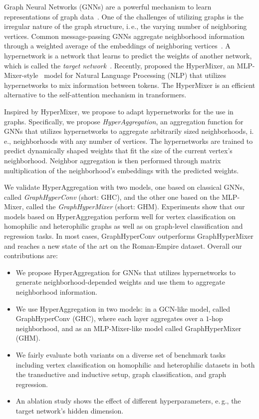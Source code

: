\documentclass[conference]{IEEEtran}
\newcommand{\ie}{i.\,e.,\xspace}
\newcommand{\eg}{e.\,g.,\xspace}
\begin{document}
Graph Neural Networks (GNNs) are a powerful mechanism to learn representations of graph data~\citep{DBLP:series/synthesis/2020Hamilton}.
One of the challenges of utilizing graphs is the irregular nature of the graph structure, \ie the varying number of neighboring vertices.
Common message-passing GNNs aggregate neighborhood information through a weighted average of the embeddings of neighboring vertices~\citep{DBLP:conf/iclr/KipfW17,DBLP:conf/iclr/VelickovicCCRLB18}.
A hypernetwork is a network that learns to predict the weights of another network, which is called the \textit{target network}~\citep{DBLP:conf/iclr/HaDL17}.
Recently, \citet{DBLP:conf/acl/MaiPFCMF023} proposed the HyperMixer, an MLP-Mixer-style~\citep{DBLP:conf/nips/TolstikhinHKBZU21} model for Natural Language Processing (NLP) that utilizes hypernetworks to mix information between tokens.
The HyperMixer is an efficient alternative to the self-attention mechanism in transformers.

Inspired by HyperMixer, we propose to adapt hypernetworks for the use in graphs.
Specifically, we propose \textit{HyperAggregation}, an aggregation function for GNNs that utilizes hypernetworks to aggregate arbitrarily sized neighborhoods, \ie neighborhoods with any number of vertices.
The hypernetworks are trained to predict dynamically shaped weights that fit the size of the current vertex's neighborhood.
Neighbor aggregation is then performed through matrix multiplication of the neighborhood's embeddings with the predicted weights.

We validate HyperAggregation with two models, one based on classical GNNs, called \textit{GraphHyperConv} (short: GHC), and the other one based on the MLP-Mixer, called the \textit{GraphHyperMixer} (short: GHM).
Experiments show that our models based on HyperAggregation perform well for vertex classification on homophilic and heterophilic graphs as well as on graph-level classification and regression tasks.
In most cases, GraphHyperConv outperforms GraphHyperMixer and reaches a new state of the art on the Roman-Empire dataset.
Overall our contributions are: 

\begin{itemize}
\item We propose HyperAggregation for GNNs that utilizes hypernetworks to generate neighborhood-depended weights and use them to aggregate neighborhood information.

\item We use HyperAggregation in two models: in a GCN-like model, called GraphHyperConv (GHC), where each layer aggregates over a $1$-hop neighborhood, and as an MLP-Mixer-like model called GraphHyperMixer (GHM).

\item We fairly evaluate both variants on a diverse set of benchmark tasks including vertex classification on homophilic and heterophilic datasets in both the transductive and inductive setup, graph classification, and graph regression.

\item An ablation study shows the effect of different hyperparameters, \eg the target network's hidden dimension.
\end{itemize}
\end{document}

